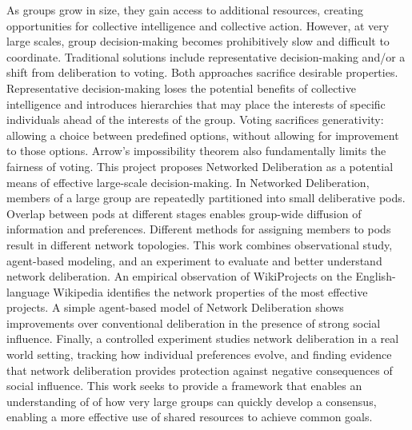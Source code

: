 As groups grow in size, they gain access to additional resources, creating opportunities for collective intelligence and collective action.
However, at very large scales, group decision-making becomes prohibitively slow and difficult to coordinate.
Traditional solutions include representative decision-making and/or a shift from deliberation to voting.
Both approaches sacrifice desirable properties.
Representative decision-making loses the potential benefits of collective intelligence and introduces hierarchies that may place the interests of specific individuals ahead of the interests of the group.
Voting sacrifices generativity: allowing a choice between predefined options, without allowing for improvement to those options.
Arrow’s impossibility theorem also fundamentally limits the fairness of voting.
This project proposes Networked Deliberation as a potential means of effective large-scale decision-making.
In Networked Deliberation, members of a large group are repeatedly partitioned into small deliberative pods.
Overlap between pods at different stages enables group-wide diffusion of information and preferences.
Different methods for assigning members to pods result in different network topologies.
This work combines observational study, agent-based modeling, and an experiment to evaluate and better understand network deliberation.
An empirical observation of WikiProjects on the English-language Wikipedia identifies the network properties of the most effective projects.
A simple agent-based model of Network Deliberation shows improvements over conventional deliberation in the presence of strong social influence.
Finally, a controlled experiment studies network deliberation in a real world setting, tracking how individual preferences evolve, and finding evidence that network deliberation provides protection against negative consequences of social influence.
This work seeks to provide a framework that enables an understanding of
of how very large groups can quickly develop a consensus, enabling a more effective use of shared resources to achieve common goals.